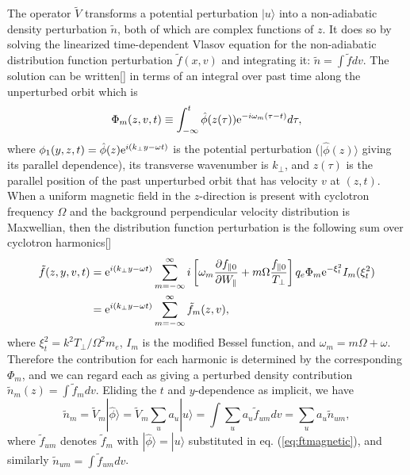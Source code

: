 \documentclass[12pt]{article}
\def\ket#1{|#1\rangle}
\begin{document}
The operator $\tilde{V}$ transforms a potential perturbation $\ket{u}$
into a non-adiabatic density perturbation $\tilde n$, both of which
are complex functions of $z$. It does so by solving the linearized
time-dependent Vlasov equation for the non-adiabatic distribution
function perturbation $\tilde f(x,v)$ and integrating it:
$\tilde n =\int \tilde f dv$. The solution can be written[] in terms of
an integral over past time along the unperturbed orbit which is
\begin{equation}
  \label{eq:phim}
  \Phi_m(z,v,t)\equiv 
  \int_{-\infty}^t \hat\phi(z(\tau)){\rm e}^{-i\omega_m(\tau-t)}d\tau,
\end{equation}
where $\phi_1(y,z,t)=\hat\phi(z){\rm e}^{i(k_\perp y-\omega t)}$ is
the potential perturbation ($\ket{\hat\phi(z)}$ giving its parallel
dependence), its transverse wavenumber is $k_\perp$, and $z(\tau)$ is
the parallel position of the past unperturbed orbit that has velocity
$v$ at $(z,t)$. When a uniform magnetic field in the $z$-direction is
present with cyclotron frequency $\Omega$ and the background
perpendicular velocity distribution is Maxwellian, then the
distribution function perturbation is the following sum over cyclotron
harmonics[]
\begin{equation}\label{eq:ftmagnetic}
  \begin{split}
    \tilde f(z,y,v,t) &=  {\rm e}^{i(k_\perp y-\omega t)}
 \sum_{m=-\infty}^\infty i\left[\omega_m
  {\partial f_{\parallel0}\over \partial W_\parallel}
  +m\Omega {f_{\parallel0}\over T_\perp}\right]
  q_e\Phi_m {\rm e}^{-\xi_t^2}I_m(\xi_t^2)\\
  &= {\rm e}^{i(k_\perp y-\omega t)} \sum_{m=-\infty}^\infty \tilde f_m(z,v),
  \end{split}
\end{equation}
where $\xi_t^2=k^2T_\perp/\Omega^2m_e$, $I_m$ is the modified Bessel
function, and $\omega_m=m\Omega+\omega$. Therefore the contribution
for each harmonic is determined by the corresponding $\Phi_m$, and we
can regard each as giving a perturbed density contribution
$\tilde n_m(z)=\int \tilde f_m dv$. Eliding the $t$ and $y$-dependence
as implicit, we have
\begin{equation}
  \label{eq:13}
\tilde  n_m=\tilde{V}_{m}\ket{\hat\phi}=\tilde{V}_{m}\sum_u a_u\ket{u}=\int \sum_u a_u
  \tilde f_{um} dv=\sum_u a_u \tilde n_{um},
\end{equation}
where $\tilde f_{um}$ denotes $\tilde f_m$ with
$\ket{\hat\phi}=\ket{u}$ substituted in eq. (\ref{eq:ftmagnetic}), and
similarly $\tilde n_{um}=\int \tilde f_{um}dv$.
\end{document}
